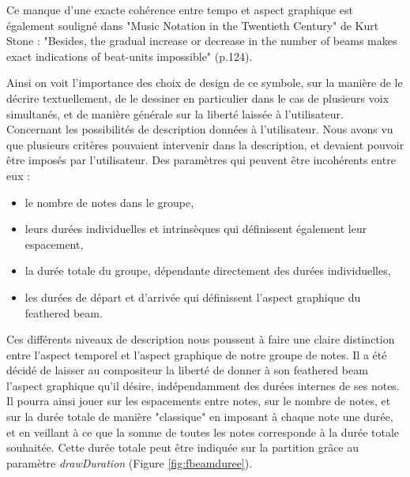 \documentclass[a4paper,10pt,twocolumn]{article}
\begin{document}
Ce manque d'une exacte cohérence entre tempo et aspect graphique est également souligné dans "Music Notation in the Twentieth Century" de Kurt Stone \cite{ref3} : "Besides, the gradual increase or decrease in the number of beams makes exact indications of beat-units impossible" (p.124).

Ainsi on voit l'importance des choix de design de ce symbole, sur la manière de le décrire textuellement, de le dessiner en particulier dans le cas de plusieurs voix simultanés, et de manière générale sur la liberté laissée à l'utilisateur.
\\

Concernant les possibilités de description données à l'utilisateur. Nous avons vu que plusieurs critères pouvaient intervenir dans la description, et devaient pouvoir être imposés par l'utilisateur. Des paramètres qui peuvent être incohérents entre eux :
\begin{itemize}
\item le nombre de notes dans le groupe,
\item leurs durées individuelles et intrinsèques qui définissent également leur espacement,
\item la durée totale du groupe, dépendante directement des durées individuelles,
\item les durées de départ et d'arrivée qui définissent l'aspect graphique du feathered beam.
\end{itemize}

Ces différents niveaux de description nous poussent à faire une claire distinction entre l'aspect temporel et l'aspect graphique de notre groupe de notes.  Il a été décidé de laisser au compositeur la liberté de donner à son feathered beam l'aspect graphique qu'il désire, indépendamment des durées internes de ses notes. Il pourra ainsi jouer sur les espacements entre notes, sur le nombre de notes, et sur la durée totale de manière "classique" en imposant à chaque note une durée, et en veillant à ce que la somme de toutes les notes corresponde à la durée totale souhaitée. Cette durée totale peut être indiquée sur la partition grâce au paramètre \textit{drawDuration} (Figure \ref{fig:fbeamduree}).
\end{document}
